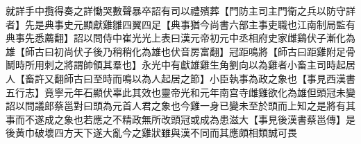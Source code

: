 就詳手中攬得奏之詳慟哭數聲暴卒詔有司以禮殯葬【門防主司主門衛之兵以防守詳者】先是典事史元顯獻雞雛四翼四足【典事猶今尚書六部主事吏職也江南制局監有典事先悉薦翻】詔以問侍中崔光光上表曰漢元帝初元中丞相府史家雌鷄伏子漸化為雄【師古曰初尚伏子後乃稍稍化為雄也伏音房富翻】冠距鳴將【師古曰距雞附足骨鬭時所用刺之將謂帥領其羣也】永光中有獻雄雞生角劉向以為雞者小畜主司時起居人【畜許又翻師古曰至時而鳴以為人起居之節】小臣執事為政之象也【事見西漢書五行志】竟寧元年石顯伏辜此其效也靈帝光和元年南宫寺雌雞欲化為雄但頭冠未變詔以問議郎蔡邕對曰頭為元首人君之象也今雞一身已變未至於頭而上知之是將有其事而不遂成之象也若應之不精政無所改頭冠或成為患滋大【事見後漢書蔡邕傳】是後黄巾破壞四方天下遂大亂今之雞狀雖與漢不同而其應頗相類誠可畏